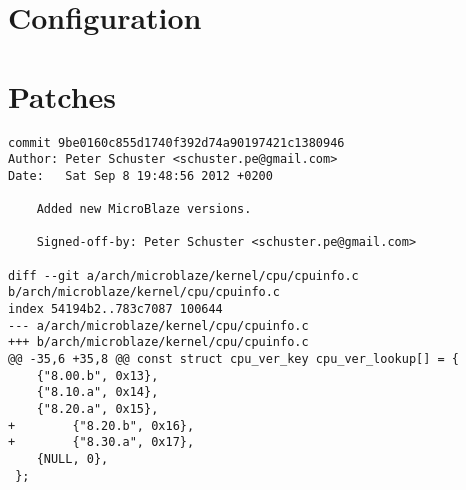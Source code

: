 \section{Configuration}

\section{Patches}

\begin{verbatim}
commit 9be0160c855d1740f392d74a90197421c1380946
Author: Peter Schuster <schuster.pe@gmail.com>
Date:   Sat Sep 8 19:48:56 2012 +0200

    Added new MicroBlaze versions.
    
    Signed-off-by: Peter Schuster <schuster.pe@gmail.com>

diff --git a/arch/microblaze/kernel/cpu/cpuinfo.c b/arch/microblaze/kernel/cpu/cpuinfo.c
index 54194b2..783c7087 100644
--- a/arch/microblaze/kernel/cpu/cpuinfo.c
+++ b/arch/microblaze/kernel/cpu/cpuinfo.c
@@ -35,6 +35,8 @@ const struct cpu_ver_key cpu_ver_lookup[] = {
 	{"8.00.b", 0x13},
 	{"8.10.a", 0x14},
 	{"8.20.a", 0x15},
+        {"8.20.b", 0x16},
+        {"8.30.a", 0x17},
 	{NULL, 0},
 };
\end{verbatim}